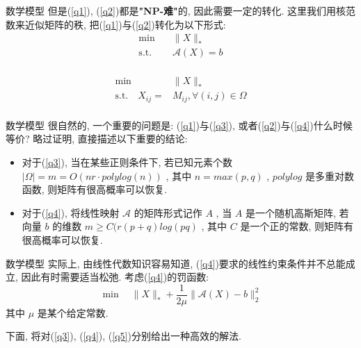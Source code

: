 \documentclass[slidestop,compress,mathserif,UTF8]{beamer}
\numberwithin{equation}{section}                                %
\begin{document}
            \begin{frame}[t]{数学模型}
                但是(\ref{q1}), (\ref{q2})都是\textbf{"NP-难"}的, 因此需要一定的转化. 这里我们用核范数来近似矩阵的秩, 把(\ref{q1})与(\ref{q2})转化为以下形式:
                \begin{equation}
                    \begin{split}\label{q3}
                        \min \quad
                            & \lVert{X}\rVert_*\\
                        \text{s.t.} \quad
                            & \mathcal{A}(X) = b\\	
                    \end{split}
                \end{equation}
                
                \begin{equation}
                    \begin{split}\label{q4}
                        \min \quad
                            & \lVert{X}\rVert_*\\
                        \text{s.t.} \quad
                            X_{ij} = &M_{ij}, \forall(i,j)\in\Omega\\
                    \end{split}
                \end{equation}
            \end{frame}
            \begin{frame}[t]{数学模型 }
                很自然的, 一个重要的问题是: (\ref{q1})与(\ref{q3}), 或者(\ref{q2})与(\ref{q4})什么时候等价? 略过证明, 直接描述以下重要的结论:
                
                \begin{itemize}
                    \item 对于(\ref{q3}), 当在某些正则条件下, 若已知元素个数 $\lvert{\Omega}\rvert = m = O(nr \cdot polylog(n))$ , 其中 $n=max(p,q)$ , $polylog$ 是多重对数函数, 则矩阵有很高概率可以恢复.\\

                    \item 对于(\ref{q4}), 将线性映射 $\mathcal{A}$ 的矩阵形式记作 $A$ , 当 $A$ 是一个随机高斯矩阵, 若向量 $b$ 的维数 $m \ge C(r(p + q)log(pq)$ , 其中 $C$ 是一个正的常数, 则矩阵有很高概率可以恢复.
                \end{itemize}
            \end{frame}
            \begin{frame}[t]{数学模型}
                实际上, 由线性代数知识容易知道, (\ref{q4})要求的线性约束条件并不总能成立, 因此有时需要适当松弛. 考虑(\ref{q4})的罚函数:
                \begin{equation}\label{q5}
                    \min \quad \lVert{X}\rVert_*+ \frac{1}{2\mu} \lVert{\mathcal{A}(X) - b}\rVert_2^2
                \end{equation}
                \small{其中 $\mu$ 是某个给定常数.}\normalsize

                下面, 将对(\ref{q3}), (\ref{q4}), (\ref{q5})分别给出一种高效的解法.
            \end{frame}
\end{document}
